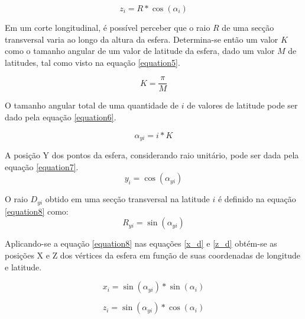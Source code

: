 \documentclass[conference]{IEEEtran}
\begin{document}
\begin{equation}
z_{i} = R * \cos(\alpha_{i})
\label{z_d}
\end{equation}

Em um corte longitudinal, é possível perceber que o raio $R$ de uma secção transversal varia ao longo da altura da esfera. Determina-se então um valor $K$ como o tamanho angular de um valor de latitude da esfera, dado um valor $M$ de latitudes, tal como visto na equação \ref{equation5}.


\begin{equation}
K = \frac{\pi}{M}
\label{equation5}
\end{equation}

O tamanho angular total de uma quantidade de $i$ de valores de latitude pode ser dado pela equação \ref{equation6}.

\begin{equation}
\alpha_{yi} = i * K
\label{equation6}
\end{equation}

A posição Y dos pontos da esfera, considerando raio unitário, pode ser dada pela equação \ref{equation7}.
\begin{equation}
y_{i} = \cos(\alpha_{yi})
\label{equation7}
\end{equation}

O raio $D_{yi}$ obtido em uma secção transversal na latitude $i$ é definido na equação \ref{equation8} como:
\begin{equation}
R_{yi} = \sin(\alpha_{yi})
\label{equation8}
\end{equation}

Aplicando-se a equação \ref{equation8} nas equações \ref{x_d} e \ref{z_d} obtém-se as posições X e Z dos vértices da esfera em função de suas coordenadas de longitude e latitude.

\begin{equation}
x_{i} = \sin(\alpha_{yi}) * \sin(\alpha_i)
\label{equation9}
\end{equation}

\begin{equation}
z_{i} = \sin(\alpha_{yi}) * \cos(\alpha_i)
\label{equation10}
\end{equation}
\end{document}

